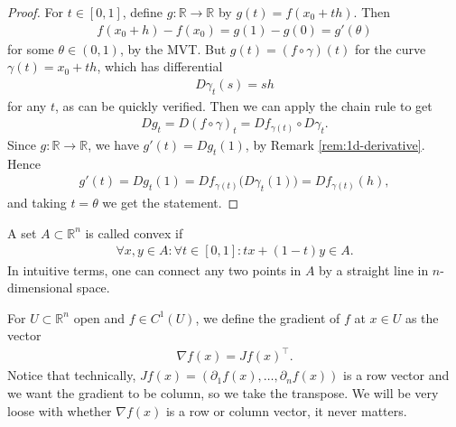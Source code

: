 \begin{proof}
	For $t \in [0,1]$, define $g: \mathbb{R} \to \mathbb{R}$ by $g(t) = f(x_{0} + th)$. Then
	\begin{align*}
		f(x_{0}+h) - f(x_{0}) = g(1) - g(0) = g'(\theta)
	\end{align*}
	for some $\theta \in (0,1)$, by the MVT. But $g(t) = (f \circ \gamma) (t)$ for the curve $\gamma (t) = x_{0} + th$, which has differential
	\begin{align*}
		D\gamma_{t}(s) = sh
	\end{align*}
	for any $t$, as can be quickly verified. Then we can apply the chain rule to get
	\begin{align*}
		Dg_{t} = D(f \circ \gamma)_{t} = Df_{\gamma (t)} \circ D\gamma_{t}.
	\end{align*}
	Since $g : \mathbb{R} \to \mathbb{R}$, we have $g'(t) = Dg_{t}(1)$, by Remark \ref{rem:1d-derivative}. Hence
	\begin{align*}
		g'(t) = Dg_{t}(1) = Df_{\gamma (t)}\bigl(D\gamma_{t}(1)\bigr) = Df_{\gamma (t)}(h),
	\end{align*}
	and taking $t = \theta$ we get the statement.
\end{proof}

\begin{definition}\label{def:convexity}
	A set $A \subset \mathbb{R}^{n}$ is called convex if
	\begin{align*}
		\forall x,y \in A: \forall t \in [0,1]: tx + (1-t)y \in A.
	\end{align*}
	In intuitive terms, one can connect any two points in $A$ by a straight line in $n$-dimensional space.
\end{definition}

\begin{definition}[Gradient]\label{def:gradient}
	For $U \subset \mathbb{R}^{n}$ open and $f \in C^{1}(U)$, we define the gradient of $f$ at $x \in U$ as the vector
	\begin{align*}
		\nabla f(x) = Jf(x)^\top.
	\end{align*}
	Notice that technically, $Jf(x) = (\partial_{1}f(x), \dots, \partial_{n}f(x))$ is a row vector and we want the gradient to be column, so we take the transpose. We will be very loose with whether $\nabla f(x)$ is a row or column vector, it never matters. 
\end{definition}

